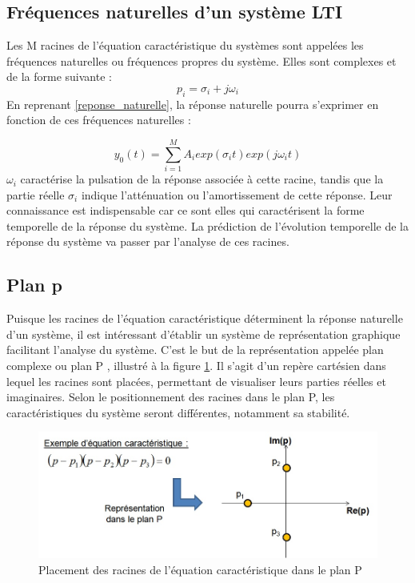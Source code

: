 	\vspace{1\baselineskip}
	
	\subsection{Fréquences naturelles d'un système LTI}
	Les M racines de l'équation caractéristique du systèmes sont appelées les fréquences naturelles ou fréquences propres du système. Elles sont complexes et de la forme suivante :
	\begin{equation}\label{freq_propre}
	p_{i} = \sigma_{i} + j\omega_{i} 
	\end{equation}	
	En reprenant \ref{reponse_naturelle}, la réponse naturelle pourra s'exprimer en fonction de ces fréquences naturelles :
		
	\begin{equation}\label{Reponse_Naturelle}
	y_{0}(t) = \sum_{i=1}^M A_{i}exp(\sigma_{i}  t) exp(j\omega_{i} t)
	\end{equation}
	$\omega_{i}$ caractérise la pulsation de la réponse associée à cette racine, tandis que la partie réelle $\sigma_{i}$ indique l'atténuation ou l'amortissement de cette réponse. Leur connaissance est indispensable car ce sont elles qui caractérisent la forme temporelle de la réponse du système. La prédiction de l'évolution temporelle de la réponse du système va passer par l'analyse de ces racines. 
	
	\subsection{Plan p}
	Puisque les racines de l'équation caractéristique déterminent la réponse naturelle d'un système, il est intéressant d'établir un système de représentation graphique facilitant l'analyse du système. C'est le but de la représentation appelée plan complexe ou plan P , illustré à la figure \ref{Fig:Plan_P}. Il s'agit d'un repère cartésien dans lequel les racines sont placées, permettant de visualiser leurs parties réelles et imaginaires. Selon le positionnement des racines dans le plan P, les caractéristiques du système seront différentes, notamment sa stabilité.
	\begin{figure}[h!]
		\centering
		\includegraphics[scale=0.5]{images/Plan_P.jpg} 
		\caption{Placement des racines de l'équation caractéristique dans le plan P}	
		\label{Fig:Plan_P}
	\end{figure}

